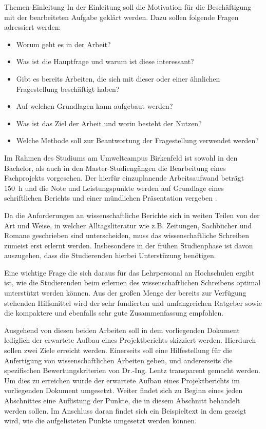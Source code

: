 %
\begin{simplebox}{Themen-Einleitung}
%
In der Einleitung soll die Motivation für die Beschäftigung mit der bearbeiteten Aufgabe geklärt werden.
Dazu sollen folgende Fragen adressiert werden:
%
\begin{itemize}
\item Worum geht es in der Arbeit? 
\item Was ist die Hauptfrage und warum ist diese interessant?
\item Gibt es bereits Arbeiten, die sich mit dieser oder einer ähnlichen Fragestellung beschäftigt haben?
\item Auf welchen Grundlagen kann aufgebaut werden?
\item Was ist das Ziel der Arbeit und worin besteht der Nutzen?
\item Welche Methode soll zur Beantwortung der Fragestellung verwendet werden?
\end{itemize}
%
\end{simplebox}
%
Im Rahmen des Studiums am Umweltcampus Birkenfeld ist sowohl in den Bachelor, als auch in den Master-Studiengängen die Bearbeitung eines Fachprojekts vorgesehen.
Der hierfür einzuplanende Arbeitsaufwand beträgt \SI{150}{\hour} und die Note und Leistungspunkte werden auf Grundlage eines schriftlichen Berichts und einer mündlichen Präsentation vergeben \cite{modulhandbuch}.
\par
Da die Anforderungen an wissenschaftliche Berichte sich in weiten Teilen von der Art und Weise, in welcher Alltagsliteratur wie z.B. Zeitungen, Sachbücher und Romane geschrieben sind unterscheiden, muss das wissenschaftliche Schreiben zumeist erst erlernt werden. 
Insbesondere in der frühen Studienphase ist davon auszugehen, dass die Studierenden hierbei Unterstüzung benötigen.
\par
Eine wichtige Frage die sich daraus für das Lehrpersonal an Hochschulen ergibt ist, wie die Studierenden beim erlernen des wissenschaftlichen Schreibens optimal unterstützt werden können.
Aus der großen Menge der bereits zur Verfügung stehenden Hilfsmittel wird der sehr fundierten und umfangreichen Ratgeber \cite{teHeesen} sowie die kompaktere und ebenfalls sehr gute Zusammenfassung \cite{Rumpler} empfohlen.
\par 
Ausgehend von diesen beiden Arbeiten soll in dem vorliegenden Dokument lediglich der erwartete Aufbau eines Projektberichts skizziert werden.
Hierdurch sollen zwei Ziele erreicht werden.
Einerseits soll eine Hilfestellung für die Anfertigung von wissenschaftlichen Arbeiten geben, und andererseits die spezifischen Bewertungskriterien von Dr.-Ing. Lentz transparent gemacht werden.
Um dies zu erreichen wurde der erwartete Aufbau eines Projektberichts im vorliegenden Dokument umgesetzt.  
Weiter findet sich zu Beginn eines jeden Abschnittes eine Auflistung der Punkte, die in diesem Abschnitt behandelt werden sollen.
Im Anschluss daran findet sich ein Beispieltext in dem gezeigt wird, wie die aufgelisteten Punkte umgesetzt werden können. 
%